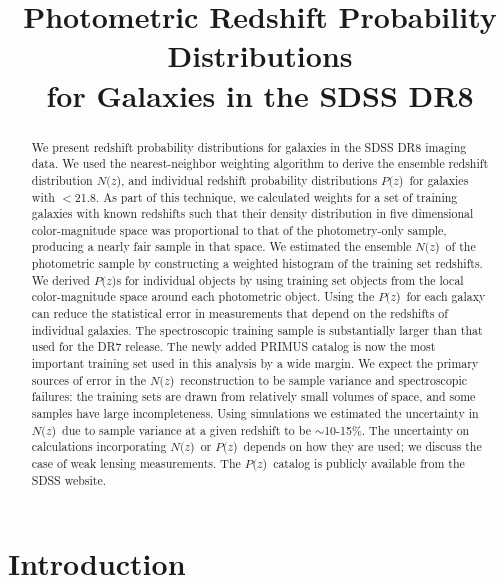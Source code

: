\documentclass[12pt,preprint]{aastex}
\newcommand{\localbias}{10-15\%}
\newcommand{\rmax}{21.8}
\newcommand{\pofz}{$P(z$)}
\newcommand{\nofz}{$N(z$)}
\newcommand{\cc}[1]{\textcolor{red}{[{\bf Carlos}: #1]}}
\begin{document}
\title{Photometric Redshift Probability Distributions \\for Galaxies in the SDSS DR8}



\begin{abstract}


We present redshift probability distributions for galaxies in the SDSS DR8
imaging data.  We used the nearest-neighbor weighting algorithm
\citep{LimaPhotoz08,CunhaPhotoz09} to derive the ensemble redshift distribution
\nofz, and individual redshift probability distributions \pofz\ for galaxies
with \rmag$ < $\rmax.  As part of this technique, we calculated weights for a
set of training galaxies with known redshifts such that their density
distribution in five dimensional color-magnitude space was proportional to that
of the photometry-only sample, producing a nearly fair sample in that space.
We estimated the ensemble \nofz\ of the photometric sample by constructing a
weighted histogram of the training set redshifts.  We derived \pofz s for
individual objects by using training set objects from the local color-magnitude
space around each photometric object.  Using the \pofz\ for each galaxy can
reduce the statistical error in measurements that depend on the redshifts of
individual galaxies. The spectroscopic training sample is substantially larger
than that used for the DR7 release. The newly added PRIMUS catalog is now the
most important training set used in this analysis by a wide margin.  We expect
the primary sources of error in the \nofz\ reconstruction to be sample variance
and spectroscopic failures: the training sets are drawn from relatively small 
volumes of space, and some samples have large incompleteness.  Using
simulations we estimated the uncertainty in \nofz\ due to sample variance at a given redshift to
be $\sim$\localbias. 
 The uncertainty on calculations incorporating \nofz\ or
\pofz\ depends on how they are used; we discuss the case of weak lensing
measurements.  The \pofz\ catalog is publicly available from the SDSS website.  

\end{abstract}

\section{Introduction} \label{sec:intro}
\end{document}
